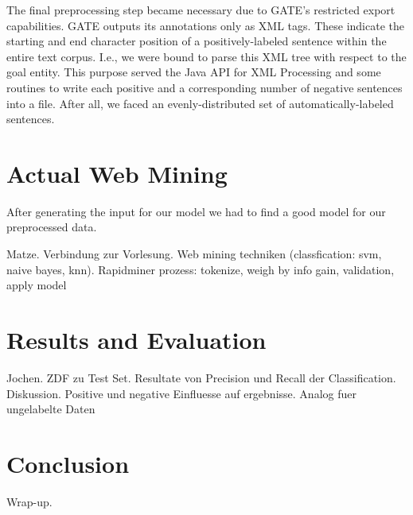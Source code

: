 \documentclass[11pt,titlepage,oneside,openany]{book}
\begin{document}
The final preprocessing step became necessary due to GATE's restricted export capabilities. GATE outputs its annotations only as XML tags. These indicate the starting and end character position of a  positively-labeled sentence within the entire text corpus. I.e., we were bound to parse this XML tree with respect to the goal entity. This purpose served the Java API for XML Processing and some routines to write each positive and a corresponding number of negative sentences into a file. After all, we faced an evenly-distributed set of automatically-labeled sentences.

\section{Actual Web Mining}
\label{sec:webmining}
After generating the input for our model we had to find a good model for our preprocessed data. 

Matze. Verbindung zur Vorlesung. Web mining techniken (classfication: svm, naive bayes, knn). Rapidminer prozess: tokenize, weigh by info gain, validation, apply model

\section{Results and Evaluation}
\label{sec:eval}
Jochen. ZDF zu Test Set. Resultate von Precision und Recall der Classification. Diskussion. Positive und negative Einfluesse auf ergebnisse. Analog fuer ungelabelte Daten 
\section{Conclusion}
Wrap-up.



\end{document}
